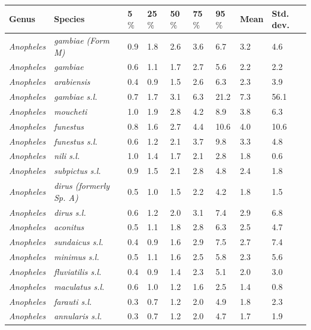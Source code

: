 \documentclass[12pt]{article}
\begin{document}
\begin{table}[htbp!]
	\begin{tabular}{l|l|l|l|l|l|l|l|l}
		\textbf{Genus} & \textbf{Species} & \textbf{5$\%$} & \textbf{25$\%$} & \textbf{50$\%$} &
		\textbf{75$\%$} & \textbf{95$\%$} & \textbf{Mean} & \textbf{Std. dev.} \\
		\hline
	\textit{Anopheles} & \textit{gambiae (Form M)} & 0.9 & 1.8 & 2.6 & 3.6 & 6.7 & 3.2 & 4.6 \\
	\textit{Anopheles} & \textit{gambiae} & 0.6 & 1.1 & 1.7 & 2.7 & 5.6 & 2.2 & 2.2 \\
	\textit{Anopheles} & \textit{arabiensis} & 0.4 & 0.9 & 1.5 & 2.6 & 6.3 & 2.3 & 3.9 \\
	\textit{Anopheles} & \textit{gambiae s.l.} & 0.7 & 1.7 & 3.1 & 6.3 & 21.2 & 7.3 & 56.1 \\
	\textit{Anopheles} & \textit{moucheti} & 1.0 & 1.9 & 2.8 & 4.2 & 8.9 & 3.8 & 6.3 \\
	\textit{Anopheles} & \textit{funestus} & 0.8 & 1.6 & 2.7 & 4.4 & 10.6 & 4.0 & 10.6 \\
	\textit{Anopheles} & \textit{funestus s.l.} & 0.6 & 1.2 & 2.1 & 3.7 & 9.8 & 3.3 & 4.8 \\
	\textit{Anopheles} & \textit{nili s.l.} & 1.0 & 1.4 & 1.7 & 2.1 & 2.8 & 1.8 & 0.6 \\
	\textit{Anopheles} & \textit{subpictus s.l.} & 0.9 & 1.5 & 2.1 & 2.8 & 4.8 & 2.4 & 1.8 \\
	\textit{Anopheles} & \textit{dirus (formerly Sp. A)} & 0.5 & 1.0 & 1.5 & 2.2 & 4.2 & 1.8 &
	1.5 \\
	\textit{Anopheles} & \textit{dirus s.l.} & 0.6 & 1.2 & 2.0 & 3.1 & 7.4 & 2.9 & 6.8 \\
	\textit{Anopheles} & \textit{aconitus} & 0.5 & 1.1 & 1.8 & 2.8 & 6.3 & 2.5 & 4.7 \\
	\textit{Anopheles} & \textit{sundaicus s.l.} & 0.4 & 0.9 & 1.6 & 2.9 & 7.5 & 2.7 & 7.4 \\
	\textit{Anopheles} & \textit{minimus s.l.} & 0.5 & 1.1 & 1.6 & 2.5 & 5.8 & 2.3 & 5.6 \\
	\textit{Anopheles} & \textit{fluviatilis s.l.} & 0.4 & 0.9 & 1.4 & 2.3 & 5.1 & 2.0 & 3.0 \\
	\textit{Anopheles} & \textit{maculatus s.l.} & 0.6 & 1.0 & 1.2 & 1.6 & 2.5 & 1.4 & 0.8 \\
	\textit{Anopheles} & \textit{farauti s.l.} & 0.3 & 0.7 & 1.2 & 2.0 & 4.9 & 1.8 & 2.3 \\
	\textit{Anopheles} & \textit{annularis s.l.} & 0.3 & 0.7 & 1.2 & 2.0 & 4.7 & 1.7 & 1.9 \\

\end{tabular}
\end{table}
\end{document}
